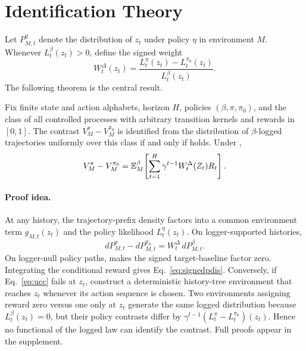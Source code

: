 \section{Identification Theory}

Let $P_{M,t}^\eta$ denote the distribution of $z_t$ under policy $\eta$ in environment $M$. Whenever $L_t^\beta(z_t)>0$, define the signed weight
\begin{equation}
W_t^\Delta(z_t)=
\frac{L_t^\pi(z_t)-L_t^{\pi_0}(z_t)}{L_t^\beta(z_t)}.
\label{eq:signedweight}
\end{equation}
The following theorem is the central result.

\begin{theorem}
\label{thm:identification}
Fix finite state and action alphabets, horizon $H$, policies $(\beta,\pi,\pi_0)$, and the class of all controlled processes with arbitrary transition kernels and rewards in $[0,1]$. The contrast $V_M^\pi-V_M^{\pi_0}$ is identified from the distribution of $\beta$-logged trajectories uniformly over this class if and only if \UCC holds. Under \UCC,
\begin{equation}
V_M^\pi-V_M^{\pi_0}
=
\mathbb{E}_M^\beta\!\left[
\sum_{t=1}^H\gamma^{t-1}W_t^\Delta(Z_t)R_t
\right].
\label{eq:signedpdis}
\end{equation}
\end{theorem}

\paragraph{Proof idea.}
At any history, the trajectory-prefix density factors into a common environment term $g_{M,t}(z_t)$ and the policy likelihood $L_t^\eta(z_t)$. On logger-supported histories,
\[
dP_{M,t}^\pi-dP_{M,t}^{\pi_0}
=W_t^\Delta\,dP_{M,t}^\beta.
\]
On logger-null policy paths, \UCC makes the signed target-baseline factor zero. Integrating the conditional reward gives Eq.~\eqref{eq:signedpdis}. Conversely, if Eq.~\eqref{eq:ucc} fails at $z_t$, construct a deterministic history-tree environment that reaches $z_t$ whenever its action sequence is chosen. Two environments assigning reward zero versus one only at $z_t$ generate the same logged distribution because $L_t^\beta(z_t)=0$, but their policy contrasts differ by $\gamma^{t-1}(L_t^\pi-L_t^{\pi_0})(z_t)$. Hence no functional of the logged law can identify the contrast. Full proofs appear in the supplement.

